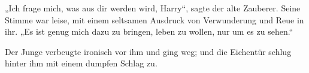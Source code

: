 „Ich frage mich, was aus dir werden wird, Harry“, sagte der alte Zauberer. Seine Stimme war leise, mit einem seltsamen Ausdruck von Verwunderung und Reue in ihr.
„Es ist genug mich dazu zu bringen, leben zu wollen, nur um es zu sehen.“

Der Junge verbeugte ironisch vor ihm und ging weg; und die Eichentür schlug hinter ihm mit einem dumpfen Schlag zu.

